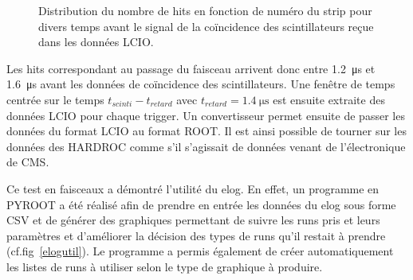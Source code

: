 \begin{figure}[ht!]
	\hfill
	\caption{Distribution du nombre de hits en fonction de numéro du strip pour divers temps avant le signal de la coïncidence des scintillateurs reçue dans les données LCIO.}
	\label{decalage}
\end{figure}  

Les hits correspondant au passage du faisceau arrivent donc entre  \SI{1.2}{\micro\second} et \SI{1.6}{\micro\second} avant les données de coïncidence des scintillateurs. Une fenêtre de temps centrée sur le temps $t_{scinti}-t_{retard}$ avec $t_{retard}=\SI{1.4}{\micro\second}$ est ensuite extraite des données LCIO pour chaque trigger. Un convertisseur permet ensuite de passer les données du format LCIO au format ROOT. Il est ainsi possible de tourner sur les données des HARDROC comme s'il s'agissait de données venant de l'électronique de CMS.

Ce test en faisceaux a démontré l'utilité du elog. En effet, un programme en PYROOT a été réalisé afin de prendre en entrée les données du elog sous forme CSV et de générer des graphiques permettant de suivre les runs pris et leurs paramètres et d'améliorer la décision des types de runs qu'il restait à prendre (cf.fig~\ref{elogutil}). Le programme a permis également de créer automatiquement les listes de runs à utiliser selon le type de graphique à produire. 


